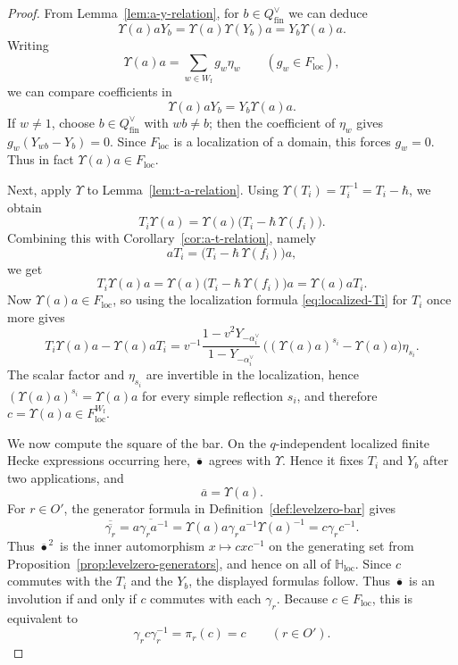 \documentclass{amsart}
\theoremstyle{definition}
\numberwithin{equation}{section}
\begin{document}
\begin{proof}
From Lemma~\ref{lem:a-y-relation}, for $b\in Q_{\mathrm{fin}}^\vee$ we can deduce
\[
\Upsilon(a)aY_b=\Upsilon(a)\Upsilon(Y_b)a=Y_b\Upsilon(a)a.
\]
Writing
\[
\Upsilon(a)a=\sum_{w\in W_{\mathrm f}} g_w\eta_w\qquad (g_w\in F_{\mathrm{loc}}),
\]
we can compare coefficients in
\[
\Upsilon(a)aY_b=Y_b\Upsilon(a)a.
\]
If $w\neq 1$, choose $b\in Q_{\mathrm{fin}}^\vee$ with $wb\neq b$; then the coefficient of $\eta_w$ gives
$g_w(Y_{wb}-Y_b)=0$. Since $F_{\mathrm{loc}}$ is a localization of a domain, this
forces $g_w=0$. Thus in fact \(\Upsilon(a)a\in F_{\mathrm{loc}}\).

Next, apply $\Upsilon$ to Lemma~\ref{lem:t-a-relation}. Using $\Upsilon(T_i)=T_i^{-1}=T_i-\hbar$, we obtain
\[
T_i\Upsilon(a)=\Upsilon(a)\bigl(T_i-\hbar\,\Upsilon(f_i)\bigr).
\]
Combining this with Corollary~\ref{cor:a-t-relation}, namely
\[
aT_i=\bigl(T_i-\hbar\,\Upsilon(f_i)\bigr)a,
\]
we get
\[
T_i\Upsilon(a)a=\Upsilon(a)\bigl(T_i-\hbar\,\Upsilon(f_i)\bigr)a=\Upsilon(a)aT_i.
\]
Now \(\Upsilon(a)a\in F_{\mathrm{loc}}\), so using the localization formula
\eqref{eq:localized-Ti} for $T_i$ once more gives
\[
T_i\Upsilon(a)a-\Upsilon(a)aT_i
=
 v^{-1}\frac{1-v^2Y_{-\alpha_i^\vee}}{1-Y_{-\alpha_i^\vee}}\,\bigl((\Upsilon(a)a)^{s_i}-\Upsilon(a)a\bigr)\eta_{s_i}.
\]
The scalar factor and $\eta_{s_i}$ are invertible in the localization, hence
\((\Upsilon(a)a)^{s_i}=\Upsilon(a)a\) for every simple reflection $s_i$, and
therefore \(c=\Upsilon(a)a\in F_{\mathrm{loc}}^{W_{\mathrm f}}\).

We now compute the square of the bar. On the \(q\)-independent localized
finite Hecke expressions occurring here, \(\overline{\bullet}\) agrees with
\(\Upsilon\). Hence it fixes \(T_i\) and \(Y_b\) after two applications, and
\[
\overline{a}=\Upsilon(a).
\]
For \(r\in O'\), the generator formula in Definition~\ref{def:levelzero-bar}
gives
\[
\overline{\overline{\gamma_r}}
=
\overline{a\gamma_r a^{-1}}
=
\Upsilon(a)a\gamma_r a^{-1}\Upsilon(a)^{-1}
=
c\gamma_r c^{-1}.
\]
Thus \(\overline{\bullet}^{\,2}\) is the inner automorphism \(x\mapsto cxc^{-1}\) on the generating set
from Proposition~\ref{prop:levelzero-generators}, and hence on all of
\(\mathbb H_{\mathrm{loc}}\). Since $c$ commutes with the $T_i$ and the $Y_b$,
the displayed formulas follow. Thus $\overline{\bullet}$ is an involution if and only if $c$
commutes with each $\gamma_r$. Because $c\in F_{\mathrm{loc}}$, this is
equivalent to
\[
\gamma_r c\gamma_r^{-1}=\pi_r(c)=c
\qquad (r\in O').
\]


\end{proof}
\end{document}
